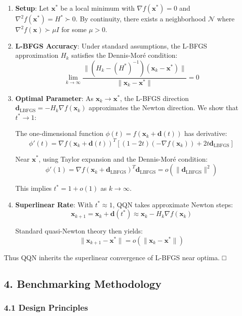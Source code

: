 \begin{enumerate}
\def\labelenumi{\arabic{enumi}.}
\item
  \textbf{Setup}: Let \(\mathbf{x}^*\) be a local minimum with \(\nabla f(\mathbf{x}^*) = 0\)
  and \(\nabla^2 f(\mathbf{x}^*) = H^* \succ 0\). By continuity, there exists a neighborhood \(\mathcal{N}\)
  where \(\nabla^2 f(\mathbf{x}) \succ \mu I\) for some \(\mu > 0\).
\item
  \textbf{L-BFGS Accuracy}: Under standard assumptions, the L-BFGS approximation \(H_k\) satisfies the Dennis-Moré condition:
  \[\lim_{k \to \infty} \frac{\|(H_k - (H^*)^{-1})(\mathbf{x}_k - \mathbf{x}^*)\|}{\|\mathbf{x}_k - \mathbf{x}^*\|} = 0\]
\item
  \textbf{Optimal Parameter}: As \(\mathbf{x}_k \to \mathbf{x}^*\), the L-BFGS
  direction \(\mathbf{d}_{\text{LBFGS}} = -H_k \nabla f(\mathbf{x}_k)\) approximates the Newton direction. We show
  that \(t^* \to 1\):

  The one-dimensional function \(\phi(t) = f(\mathbf{x}_k + \mathbf{d}(t))\) has derivative:
  \[\phi'(t) = \nabla f(\mathbf{x}_k + \mathbf{d}(t))^T[(1-2t)(-\nabla f(\mathbf{x}_k)) + 2t\mathbf{d}_{\text{LBFGS}}]\]

  Near \(\mathbf{x}^*\), using Taylor expansion and the Dennis-Moré condition:
  \[\phi'(1) = \nabla f(\mathbf{x}_k + \mathbf{d}_{\text{LBFGS}})^T \mathbf{d}_{\text{LBFGS}} = o(\|\mathbf{d}_{\text{LBFGS}}\|^2)\]

  This implies \(t^* = 1 + o(1)\) as \(k \to \infty\).
\item
  \textbf{Superlinear Rate}: With \(t^* \approx 1\), QQN takes approximate Newton steps:
  \[\mathbf{x}_{k+1} = \mathbf{x}_k + \mathbf{d}(t^*) \approx \mathbf{x}_k - H_k \nabla f(\mathbf{x}_k)\]

  Standard quasi-Newton theory then yields:
  \[\|\mathbf{x}_{k+1} - \mathbf{x}^*\| = o(\|\mathbf{x}_k - \mathbf{x}^*\|)\]
\end{enumerate}

Thus QQN inherits the superlinear convergence of L-BFGS near optima. □

\hypertarget{benchmarking-methodology}{%
\subsection{4. Benchmarking Methodology}\label{benchmarking-methodology}}

\hypertarget{design-principles}{%
\subsubsection{4.1 Design Principles}\label{design-principles}}

